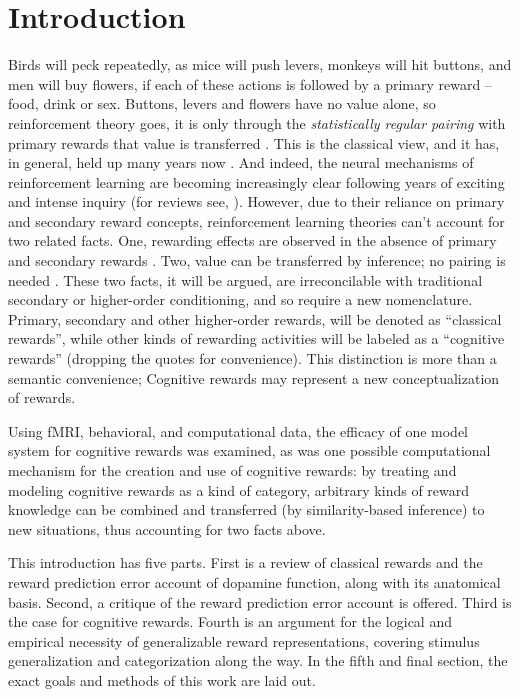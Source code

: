 \section{Introduction} %
\label{sec:introduction}
Birds will peck repeatedly, as mice will push levers, monkeys will hit buttons, and men will buy flowers, if each of these actions is followed by a primary reward -- food, drink or sex.  Buttons, levers and flowers have no value alone, so reinforcement theory goes, it is only through the \emph{statistically regular pairing} with primary rewards that value is transferred \citep{Rescorla:1988p8743}.  This is the classical view, and it has, in general, held up many years now \citep{iversen:2007aa}.  And indeed, the neural mechanisms of reinforcement learning are becoming increasingly clear following years of exciting and intense inquiry (for reviews see, \citet{Dayan:2008p6342,Dayan:2008p6479,Montague:2006mz}).  However, due to their reliance on primary and secondary reward concepts, reinforcement learning theories can't account for two related facts.  One, rewarding effects are observed in the absence of primary and secondary rewards \citep{Hayden:2009p6545, Lohrenz:2007p7240, Tricomi:2008p6663, Jimura:2010p8305}. Two, value can be transferred by inference; no pairing is needed \citep{BrombergMartin:2010p7223, Hampton:2006p2577}.  These two facts, it will be argued, are irreconcilable with traditional secondary or higher-order conditioning, and so require a new nomenclature.  Primary, secondary and other higher-order rewards, will be denoted as ``classical rewards'', while other kinds of rewarding activities will be labeled as a ``cognitive rewards'' (dropping the quotes for convenience).  This distinction is more than a semantic convenience; Cognitive rewards may represent a new conceptualization of rewards.

Using fMRI, behavioral, and computational data, the efficacy of one model system for cognitive rewards was examined, as was one possible computational mechanism for the creation and use of cognitive rewards: by treating and modeling cognitive rewards as a kind of category, arbitrary kinds of reward knowledge can be combined and transferred (by similarity-based inference) to new situations, thus accounting for two facts above.

This introduction has five parts.  First is a review of classical rewards and the reward prediction error account of dopamine function, along with its anatomical basis.  Second, a critique of the reward prediction error account is offered.  Third is the case for cognitive rewards.  Fourth is an argument for the logical and empirical necessity of generalizable reward representations, covering stimulus generalization and categorization along the way.  In the fifth and final section, the exact goals and methods of this work are laid out.  

